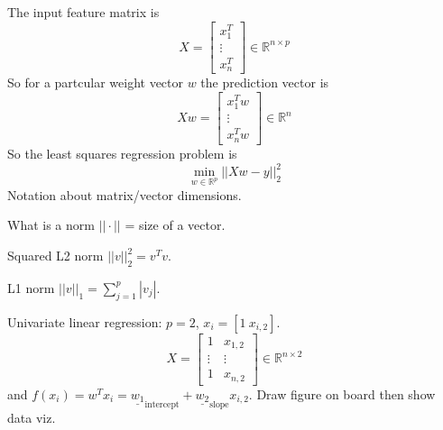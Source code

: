 \documentclass{article}
\begin{document}
The input feature matrix is 
\begin{equation}
  X = \left[\begin{array}{c}
              x_1^T \\
              \vdots \\
              x_n^T
\end{array}\right]\in\mathbb R^{n\times p}
\end{equation}
So for a partcular weight vector $w$ the prediction vector is
\begin{equation}
  Xw = \left[\begin{array}{c}
              x_1^T w \\
              \vdots \\
              x_n^T w
\end{array}\right]\in\mathbb R^{n}
\end{equation}
So the least squares regression problem is
\begin{equation}
  \min_{w\in\mathbb R^p} || Xw - y||_2^2
\end{equation}
Notation about matrix/vector dimensions.

What is a norm $||\cdot||$ = size of a vector.

Squared L2 norm $||v||_2^2 = v^T v$.

L1 norm $||v||_1 = \sum_{j=1}^p |v_j|$.

Univariate linear regression: $p=2$, $x_i=[1\ x_{i,2}]$.
\begin{equation}
  X = \left[\begin{array}{cc}
              1 & x_{1,2} \\
              \vdots & \vdots \\
              1 & x_{n,2}
\end{array}\right]\in\mathbb R^{n\times 2}
\end{equation}
and
$f(x_i) = w^T x_i = \underline{w_1}_{\text{intercept}} +
\underline{w_2}_{\text{slope}} x_{i,2}$. Draw figure on board then
show data viz.
\end{document}
